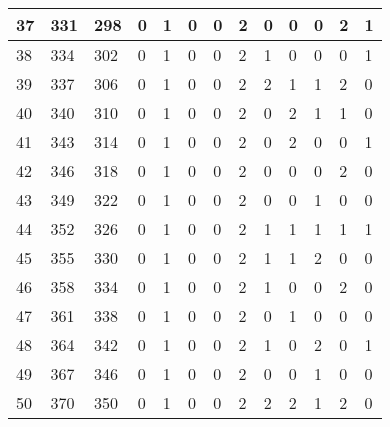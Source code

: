 \begin{sidewaystable}[!h]
\begin{tabular}{|l|l|l|l|l|l|l|l|l|l|l|l|l|}
		37 & 331 & 298 & 0 & 1 & 0 & 0 & 2 & 0 & 0 & 0 & 2 & 1 \\ \hline
		38 & 334 & 302 & 0 & 1 & 0 & 0 & 2 & 1 & 0 & 0 & 0 & 1 \\ \hline
		39 & 337 & 306 & 0 & 1 & 0 & 0 & 2 & 2 & 1 & 1 & 2 & 0 \\ \hline
		40 & 340 & 310 & 0 & 1 & 0 & 0 & 2 & 0 & 2 & 1 & 1 & 0 \\ \hline
		41 & 343 & 314 & 0 & 1 & 0 & 0 & 2 & 0 & 2 & 0 & 0 & 1 \\ \hline
		42 & 346 & 318 & 0 & 1 & 0 & 0 & 2 & 0 & 0 & 0 & 2 & 0 \\ \hline
		43 & 349 & 322 & 0 & 1 & 0 & 0 & 2 & 0 & 0 & 1 & 0 & 0 \\ \hline
		44 & 352 & 326 & 0 & 1 & 0 & 0 & 2 & 1 & 1 & 1 & 1 & 1 \\ \hline
		45 & 355 & 330 & 0 & 1 & 0 & 0 & 2 & 1 & 1 & 2 & 0 & 0 \\ \hline
		46 & 358 & 334 & 0 & 1 & 0 & 0 & 2 & 1 & 0 & 0 & 2 & 0 \\ \hline
		47 & 361 & 338 & 0 & 1 & 0 & 0 & 2 & 0 & 1 & 0 & 0 & 0 \\ \hline
		48 & 364 & 342 & 0 & 1 & 0 & 0 & 2 & 1 & 0 & 2 & 0 & 1 \\ \hline
		49 & 367 & 346 & 0 & 1 & 0 & 0 & 2 & 0 & 0 & 1 & 0 & 0 \\ \hline
		50 & 370 & 350 & 0 & 1 & 0 & 0 & 2 & 2 & 2 & 1 & 2 & 0 \\ \hline
	\end{tabular}
\end{sidewaystable}
\clearpage


